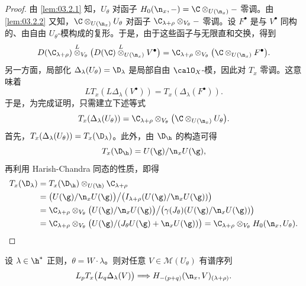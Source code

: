 \begin{proof}
由 \ref{lem:03.2.1} 知，$U_\theta$ 对函子 $H_0(\n_x,-)=\C\otimes_{U(\n_x)}-$ 零调。由 \ref{lem:03.2.2} 又知，$\C\otimes_{U(\n_x)}U_\theta$ 对函子 $\C_{\lambda+\rho}\otimes_{V_\theta}-$ 零调。设 $F^\bullet$ 是与 $V^\bullet$ 同构的、由自由 $U_\theta$-模构成的复形。于是，由于这些函子与无限直和交换，得到
$$D(\C_{\lambda+\rho})\overset{L}{\otimes}_{V_\theta}\bigl(D(\C)\overset{L}{\otimes}_{U(\n_x)}V^\bullet\bigr)=\C_{\lambda+\rho}\otimes_{V_\theta}\bigl(\C\otimes_{U(\n_x)}F^\bullet\bigr).$$
另一方面，局部化 $\Delta_\lambda(U_\theta)=\D_\lambda$ 是局部自由 $\calO_X$-模，因此对 $T_x$ 零调。这意味着
$$LT_x(L\Delta_\lambda(V^\bullet))=T_x(\Delta_\lambda(F^\bullet)).$$
于是，为完成证明，只需建立下述等式
$$T_x(\Delta_\lambda(U_\theta))=\C_{\lambda+\rho}\otimes_{V_\theta}\bigl(\C\otimes_{U(\n_x)}U_\theta\bigr).$$
首先，$T_x(\Delta_\lambda(U_\theta))=T_x(\D_\lambda)$。此外，由 $\D_\h$ 的构造可得
$$T_x(\D_\h)=U(\g)/\n_xU(\g),$$
再利用 Harish-Chandra 同态的性质，即得
\begin{align*}
T_x(\D_\lambda)&=T_x(\D_\h)\otimes_{U(\h)}\C_{\lambda+\rho}\\
&=\bigl(U(\g)/\n_xU(\g)\bigr)\big/\bigl(I_{\lambda+\rho}(U(\g)/\n_xU(\g))\bigr)\\
&=\C_{\lambda+\rho}\otimes_{V_\theta}\bigl(U(\g)/\n_xU(\g)\bigr)\big/\bigl(\gamma(J_\theta)(U(\g)/\n_xU(\g))\bigr)\\
&=\C_{\lambda+\rho}\otimes_{V_\theta}\bigl(U(\g)/(J_\theta U(\g)+\n_xU(\g))\bigr)
=\C_{\lambda+\rho}\otimes_{V_\theta}H_0(\n_x,U_\theta).
\end{align*}
\end{proof}

\begin{corollary}\label{cor:03.2.6}
设 $\lambda\in\h^*$ 正则，$\theta=W\cdot\lambda$。则对任意 $V\in\mathcal{M}(U_\theta)$ 有谱序列
$$L_pT_x\bigl(L_q\Delta_\lambda(V)\bigr)\Longrightarrow H_{-(p+q)}(\n_x,V)_{(\lambda+\rho)}.$$
\end{corollary}

